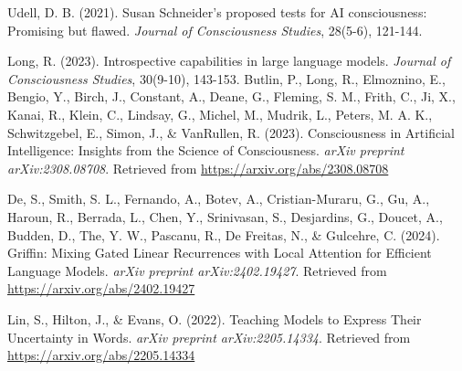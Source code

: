 \documentclass{article}
\begin{document}
\begin{thebibliography}{99}
Udell, D. B. (2021). Susan Schneider's proposed tests for AI consciousness: Promising but flawed. \textit{Journal of Consciousness Studies}, 28(5-6), 121-144.

Long, R. (2023). Introspective capabilities in large language models. \textit{Journal of Consciousness Studies}, 30(9-10), 143-153.
Butlin, P., Long, R., Elmoznino, E., Bengio, Y., Birch, J., Constant, A., Deane, G., Fleming, S. M., Frith, C., Ji, X., Kanai, R., Klein, C., Lindsay, G., Michel, M., Mudrik, L., Peters, M. A. K., Schwitzgebel, E., Simon, J., \& VanRullen, R. (2023). Consciousness in Artificial Intelligence: Insights from the Science of Consciousness. \textit{arXiv preprint arXiv:2308.08708}. Retrieved from \url{https://arxiv.org/abs/2308.08708}

De, S., Smith, S. L., Fernando, A., Botev, A., Cristian-Muraru, G., Gu, A., Haroun, R., Berrada, L., Chen, Y., Srinivasan, S., Desjardins, G., Doucet, A., Budden, D., The, Y. W., Pascanu, R., De Freitas, N., \& Gulcehre, C. (2024). Griffin: Mixing Gated Linear Recurrences with Local Attention for Efficient Language Models. \textit{arXiv preprint arXiv:2402.19427}. Retrieved from \url{https://arxiv.org/abs/2402.19427}

Lin, S., Hilton, J., \& Evans, O. (2022). Teaching Models to Express Their Uncertainty in Words. \textit{arXiv preprint arXiv:2205.14334}. Retrieved from \url{https://arxiv.org/abs/2205.14334}

\end{thebibliography}
\end{document}
